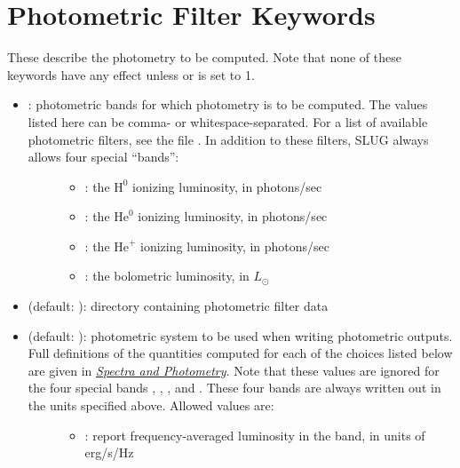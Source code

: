 \documentclass[letterpaper,10pt,english]{sphinxmanual}
\begin{document}
\section{Photometric Filter Keywords}
\label{parameters:ssec-phot-keywords}\label{parameters:photometric-filter-keywords}
These describe the photometry to be computed. Note that none of these keywords have any effect unless  or  is set to 1.
\begin{itemize}
\item {} \begin{description}
\item[{: photometric bands for which photometry is to be computed. The values listed here can be comma- or whitespace-separated. For a list of available photometric filters, see the file . In addition to these filters, SLUG always allows four special ``bands'':}] \leavevmode\begin{itemize}
\item {} 
: the \(\mathrm{H}^0\) ionizing luminosity, in photons/sec

\item {} 
: the \(\mathrm{He}^0\) ionizing luminosity, in photons/sec

\item {} 
: the \(\mathrm{He}^+\) ionizing luminosity, in photons/sec

\item {} 
: the bolometric luminosity, in \(L_\odot\)

\end{itemize}

\end{description}

\item {} 
 (default: ): directory containing photometric filter data

\item {} \begin{description}
\item[{ (default: ): photometric system to be used when writing photometric outputs. Full definitions of the quantities computed for each of the choices listed below are given in {\hyperref[intro:ssec\string-spec\string-phot]{\emph{Spectra and Photometry}}}. Note that these values are ignored for the four special bands , , , and . These four bands are always written out in the units specified above. Allowed values are:}] \leavevmode\begin{itemize}
\item {} 
: report frequency-averaged luminosity in the band, in units of erg/s/Hz


\end{itemize}
\end{description}
\end{itemize}
\end{document}
